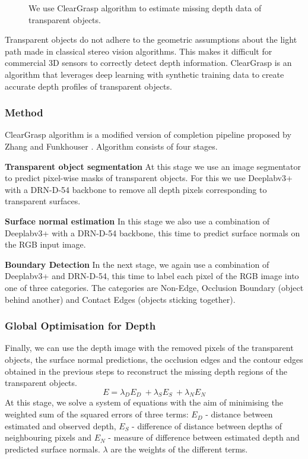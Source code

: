 \documentclass[10pt,twocolumn,letterpaper]{article}
\begin{document}
\begin{figure}
\begin{center}
\end{center}
   \caption{We use ClearGrasp algorithm to estimate missing depth data of transparent objects.}
\label{fig:ClearGrasp}
\end{figure}

Transparent objects do not adhere to the geometric assumptions about the light path made in classical stereo vision algorithms. This makes it difficult for commercial 3D sensors to correctly detect depth information. ClearGrasp is an algorithm that leverages deep learning with synthetic training data to create accurate depth profiles of transparent objects.

\subsubsection{Method}

ClearGrasp algorithm \cite{Sajjan_Moore_Pan_Nagaraja_Lee_Zeng_Song_2019} is a modified version of completion pipeline proposed by Zhang and Funkhouser \cite{47764}. Algorithm consists of four stages.

\textbf{Transparent object segmentation}
At this stage we use an image segmentator to predict pixel-wise masks of transparent objects. For this we use Deeplabv3+ \cite{7913730} \cite{Chen_Zhu_Papandreou_Schroff_Adam_2018} with a DRN-D-54 \cite{Zhang_Funkhouser_2018} backbone to remove all depth pixels corresponding to transparent surfaces.

\textbf{Surface normal estimation}
In this stage we also use a combination of Deeplabv3+ with a DRN-D-54 backbone, this time to predict surface normals on the RGB input image.

\textbf{Boundary Detection}
In the next stage, we again use a combination of Deeplabv3+ and DRN-D-54, this time to label each pixel of the RGB image into one of three categories. The categories are Non-Edge, Occlusion Boundary (object behind another) and Contact Edges (objects sticking together).

\subsubsection{Global Optimisation for Depth}
Finally, we can use the depth image with the removed pixels of the transparent objects, the surface normal predictions, the occlusion edges and the contour edges obtained in the previous steps to reconstruct the missing depth regions of the transparent objects.
\[E = \lambda_D E_D\ + \lambda_S E_S\ + \lambda_N E_N\]
At this stage, we solve a system of equations with the aim of minimising the weighted sum of the squared errors of three terms: \(E_D\) - distance between estimated and observed depth, \(E_S\) - difference of distance between depths of neighbouring pixels and \(E_N\) - measure of difference between estimated depth and predicted surface normals. \(\lambda\) are the weights of the different terms.
\end{document}
